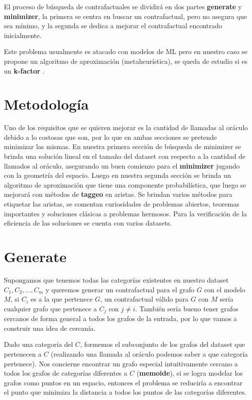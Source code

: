 \documentclass[a4paper]{article}
\begin{document}
El proceso de b\'usqueda de contrafactuales se dividir\'a en dos partes \textbf{generate} y \textbf{minimizer}, la primera se centra en buscar un contrafactual, pero no asegura que sea m\'inimo, y la segunda se dedica a mejorar el contrafactual encontrado inicialmente.

Este problema usualmente es atacado con modelos de ML pero en nuestro caso se propone un algoritmo de aproximaci\'on (metaheur\'istica), se queda de estudio si es un \textbf{k-factor} .

\section{Metodolog\'ia}

Uno de los requisitos que se quieren mejorar es la cantidad de llamadas al or\'aculo debido a lo costosas que son, por lo que en ambas secciones se pretende minimizar las mismas. En nuestra primera secci\'on de b\'usqueda de minimizer se brinda una soluci\'on lineal en el tamaño del dataset con respecto a la cantidad de llamados al or\'aculo, asegurando un buen comienzo para el \textbf{minimizer} jugando con la geometr\'ia del espacio. Luego en nuestra segunda secci\'on se brinda un algoritmo de aproximaci\'on que tiene una componente probabil\'istica, que luego se mejorar\'a con m\'etodos de \textbf{taggeo} en aristas. Se brindan varios m\'etodos para etiquetar las aristas, se comentan curiosidades de problemas abiertos, teoremas importantes y soluciones cl\'asicas a problemas hermosos. Para la verificaci\'on de la eficiencia de las soluciones se cuenta con varios datasets.

\section{Generate}


Supongamos que tenemos todas las categorías existentes en nuestro dataset $C_1, C_2, ..., C_m$ y queremos generar un contrafactual para el grafo $G$ con el modelo $M$, si  $C_i$ es a la que pertenece $G$, un contrafactual v\'alido para $G$ con $M$ ser\'ia cualquier grafo que pertenece a $C_j$ con $j \ne i$. Tambi\'en ser\'ia bueno tener grafos cercanos de forma general a todos los grafos de la entrada, por lo que vamos a construir una idea de cercanía.

Dado una categor\'ia del $C$, formemos el subconjunto de los grafos del dataset que pertenecen a $C$ (realizando una llamada al or\'aculo podemos saber a que categor\'ia pertenece). Nos concierne encontrar un grafo especial intuitivamente cercano a todos los grafos de categor\'ias diferentes a $C$ (\textbf{memoide}), si se logra modelar los grafos como puntos en un espacio, entonces el problema se reducir\'ia a encontrar el punto que minimiza la distancia a todos los puntos de las categor\'ias diferentes.
\end{document}
